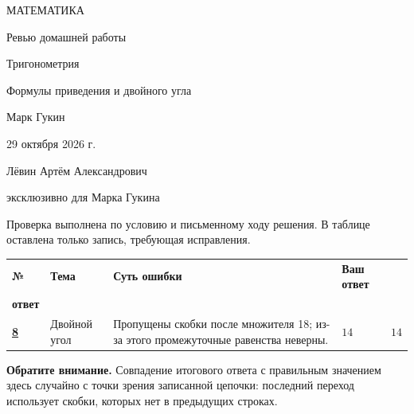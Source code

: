 \documentclass[a4paper,11pt]{article}
\newcommand{\heading}[1]{\par\vspace{8pt}{\large\color{accent}\bfseries #1}\par\vspace{2pt}}
\begin{document}
\thispagestyle{empty}
\begin{center}
\vspace*{22mm}
{\small\color{accent} МАТЕМАТИКА}\par\vspace{18mm}
{\LARGE\color{softdark} Ревью домашней работы}\par\vspace{8mm}
{\Large\color{accent} Тригонометрия}\par\vspace{4mm}
{\normalsize Формулы приведения и двойного угла}\par
\vfill
{\normalsize Марк Гукин}\par\vspace{13mm}
{\normalsize 29 октября 2026 г.}\par\vspace{14mm}
{\small Лёвин Артём Александрович}\par\vspace{2mm}
{\small эксклюзивно для Марка Гукина}\par
\vspace{14mm}
\end{center}
\clearpage
{}
\heading{Сводная таблица}
\vspace{6pt}
Проверка выполнена по условию и письменному ходу решения. В таблице оставлена только запись, требующая исправления.
\par\vspace{9pt}
\small
\begin{tabularx}{\linewidth}{@{}p{10mm}p{26mm}X p{21mm}p{23mm}@{}}
\toprule
\textbf{№} & \textbf{Тема} & \textbf{Суть ошибки} & \textbf{Ваш ответ} & \shortstack[l]{\textbf{Верный}\\\textbf{ответ}}\\
\midrule
\hyperref[task:8]{\textbf{8}} & Двойной угол & Пропущены скобки после множителя 18; из-за этого промежуточные равенства неверны. & $14$ & $14$\\
\bottomrule
\end{tabularx}
\par\normalsize
\vspace{9pt}
\textcolor{accent}{\textbf{Обратите внимание.}} Совпадение итогового ответа с правильным значением здесь случайно с точки зрения записанной цепочки: последний переход использует скобки, которых нет в предыдущих строках.
\end{document}
